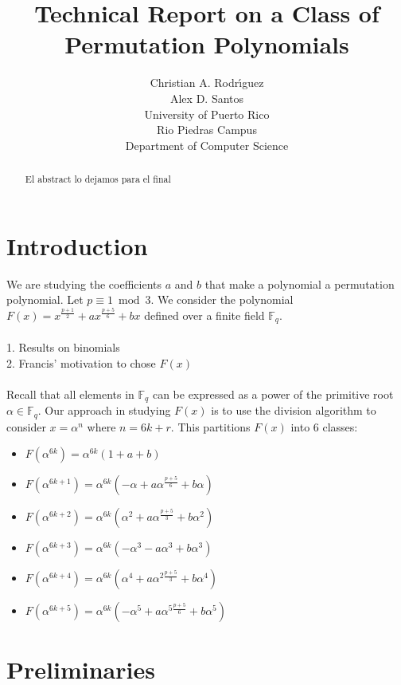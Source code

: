 \documentclass[12pt]{article}
\title{Technical Report on a Class of Permutation Polynomials}
\author{Christian A. Rodr\'{\i}guez \\ Alex D. Santos \\ University of Puerto Rico \\ Rio Piedras Campus \\ Department of Computer Science}
\date{}
\begin{document}
\maketitle

\begin{abstract}

El abstract lo dejamos para el final

\end{abstract}

\section{Introduction}\label{intro}

We are studying the coefficients $a$ and $b$ that make a polynomial a permutation polynomial. Let $p \equiv 1 \bmod{3}$. We consider the polynomial $F(x)=x^{\frac{p+1}{2}} + ax^{\frac{p+5}{6}} + bx$ defined over a finite field $\mathbb{F}_{q}$. \\
\\
1. Results on binomials \\
2. Francis' motivation to chose $F(x)$ \\
\\
Recall that all elements in $\mathbb{F}_{q}$ can be expressed as a power of the primitive root $\alpha \in \mathbb{F}_{q}$. Our approach in studying $F(x)$ is to use the division algorithm to consider $x=\alpha^{n}$ where $n=6k+r$. This partitions $F(x)$ into 6 classes:

\begin{itemize}
	\item
		$F(\alpha^{6k}) = \alpha^{6k}(1+a+b)$
	\item
		$F(\alpha^{6k+1})= \alpha^{6k}(-\alpha+a\alpha^{\frac{p+5}{6}}+b\alpha)$
	\item
		$F(\alpha^{6k+2})=\alpha^{6k}(\alpha^{2}+a\alpha^{\frac{p+5}{3}}+b\alpha^{2})$
	\item
		$F(\alpha^{6k+3})=\alpha^{6k}(-\alpha^{3}-a\alpha^{3}+b\alpha^{3})$
	\item
		$F(\alpha^{6k+4})=\alpha^{6k}(\alpha^{4}+a\alpha^{2\frac{p+5}{3}}+b\alpha^{4})$
	\item
		$F(\alpha^{6k+5})=\alpha^{6k}(-\alpha^{5}+a\alpha^{5\frac{p+5}{6}}+b\alpha^{5})$ 
\end{itemize}



\section{Preliminaries}\label{prelim}
\end{document}
